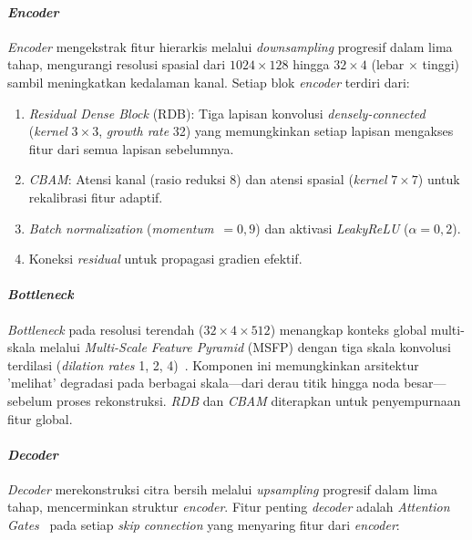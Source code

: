 \documentclass[12pt,a4paper]{article}
\begin{document}
\paragraph{\textit{Encoder}}

\textit{Encoder} mengekstrak fitur hierarkis melalui \textit{downsampling} progresif dalam lima tahap, mengurangi resolusi spasial dari $1024 \times 128$ hingga $32 \times 4$ (lebar $\times$ tinggi) sambil meningkatkan kedalaman kanal. Setiap blok \textit{encoder} terdiri dari:
\begin{enumerate}[label=\alph*., leftmargin=1.5em, labelsep=0.5em, itemindent=0pt, noitemsep, topsep=0pt]
  \item \textit{Residual Dense Block} (RDB): Tiga lapisan konvolusi \textit{densely-connected} (\textit{kernel} $3 \times 3$, \textit{growth rate} 32) yang memungkinkan setiap lapisan mengakses fitur dari semua lapisan sebelumnya.
  \item \textit{CBAM}: Atensi kanal (rasio reduksi 8) dan atensi spasial (\textit{kernel} $7 \times 7$) untuk rekalibrasi fitur adaptif.
  \item \textit{Batch normalization} (\textit{momentum}~$=0,9$) dan aktivasi \textit{LeakyReLU} ($\alpha=0,2$).
  \item Koneksi \textit{residual} untuk propagasi gradien efektif.
\end{enumerate}

\paragraph{\textit{Bottleneck}}

\textit{Bottleneck} pada resolusi terendah ($32 \times 4 \times 512$) menangkap konteks global multi-skala melalui \textit{Multi-Scale Feature Pyramid} (MSFP) dengan tiga skala konvolusi terdilasi (\textit{dilation rates} 1, 2, 4)~\parencite{chen2017deeplab}. Komponen ini memungkinkan arsitektur 'melihat' degradasi pada berbagai skala---dari derau titik hingga noda besar---sebelum proses rekonstruksi. \textit{RDB} dan \textit{CBAM} diterapkan untuk penyempurnaan fitur global.

\paragraph{\textit{Decoder}}

\textit{Decoder} merekonstruksi citra bersih melalui \textit{upsampling} progresif dalam lima tahap, mencerminkan struktur \textit{encoder}. Fitur penting \textit{decoder} adalah \textit{Attention Gates}~\parencite{oktay2018attention} pada setiap \textit{skip connection} yang menyaring fitur dari \textit{encoder}:
\end{document}
